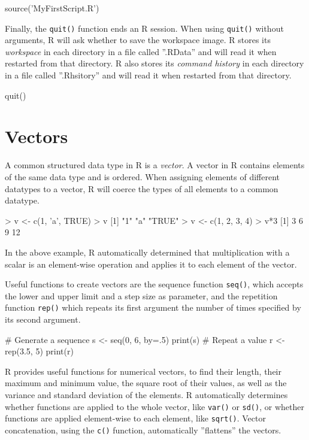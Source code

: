 \begin{Rcode}
source('MyFirstScript.R')
\end{Rcode}

Finally, the \texttt{quit()} function ends an R session. When using \texttt{quit()} without arguments, R will ask whether to save the workspace image. R stores its \emph{workspace} in each directory in a file called ''.RData'' and will read it when restarted from that directory. R also stores its \emph{command history} in each directory in a file called ''.Rhsitory'' and will read it when restarted from that directory.

\begin{Rcode}
quit()
\end{Rcode}

\section{Vectors}

A common structured data type in R is a \emph{vector}. A vector in R contains elements of the same data type and is ordered. When assigning elements of different datatypes to a vector, R will coerce the types of all elements to a common datatype.

\begin{samepage}
\begin{Rcode}
> v <- c(1, 'a', TRUE)
> v
[1] "1"    "a"    "TRUE"
> v <- c(1, 2, 3, 4)
> v*3
[1]  3  6  9 12
\end{Rcode}
\end{samepage}

In the above example, R automatically determined that multiplication with a scalar is an element-wise operation and applies it to each element of the vector. 

Useful functions to create vectors are the sequence function \texttt{seq()}, which accepts the lower and upper limit and a step size as parameter, and the repetition function \texttt{rep()} which repeats its first argument the number of times specified by its second argument.

\begin{samepage}
\begin{Rcode}
# Generate a sequence
s <- seq(0, 6, by=.5)
print(s)
# Repeat a value
r <- rep(3.5, 5)
print(r)
\end{Rcode}
\end{samepage}

R provides useful functions for numerical vectors, to find their length, their maximum and minimum value, the square root of their values, as well as the variance and standard deviation of the elements. R automatically determines whether functions are applied to the whole vector, like \texttt{var()} or \texttt{sd()}, or whether functions are applied element-wise to each element, like \texttt{sqrt()}. Vector concatenation, using the \texttt{c()} function, automatically ''flattens'' the vectors.

